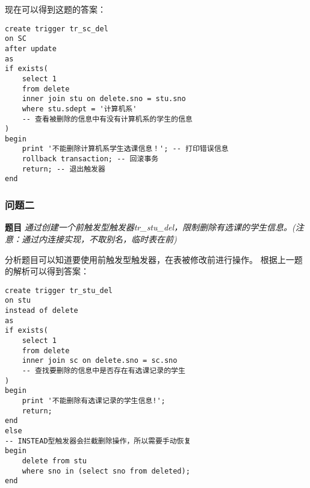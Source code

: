 \vspace{6pt}

\qquad 现在可以得到这题的答案：

\begin{mdframed}[backgroundcolor=blue!5]
\begin{verbatim}
create trigger tr_sc_del
on SC
after update
as
if exists(
    select 1
    from delete
    inner join stu on delete.sno = stu.sno
    where stu.sdept = '计算机系'
    -- 查看被删除的信息中有没有计算机系的学生的信息
)
begin
    print '不能删除计算机系学生选课信息！'; -- 打印错误信息
    rollback transaction; -- 回滚事务
    return; -- 退出触发器
end
\end{verbatim}
\end{mdframed}

\subsubsection{问题二}

\textbf{题目} \emph{通过创建一个前触发型触发器tr\_stu\_del，限制删除有选课的学生信息。(注意：通过内连接实现，不取别名，临时表在前)}

\vspace{6pt}

\qquad 分析题目可以知道要使用前触发型触发器，在表被修改前进行操作。
根据上一题的解析可以得到答案：

\begin{mdframed}[backgroundcolor=blue!5]
\begin{verbatim}
create trigger tr_stu_del
on stu
instead of delete
as
if exists(
    select 1
    from delete
    inner join sc on delete.sno = sc.sno
    -- 查找要删除的信息中是否存在有选课记录的学生
)
begin
    print '不能删除有选课记录的学生信息!';
    return;
end
else
-- INSTEAD型触发器会拦截删除操作，所以需要手动恢复
begin
    delete from stu
    where sno in (select sno from deleted);
end
\end{verbatim}
\end{mdframed}

\vspace{6pt}

